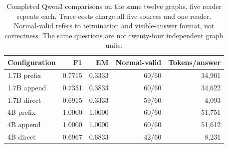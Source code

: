 \begin{table}[htbp]
\centering\small
\begin{tabular}{lrrrr}
\toprule
Configuration & F1 & EM & Normal-valid & Tokens/answer\\
\midrule
1.7B prefix & 0.7715 & 0.3333 & 60/60 & 34,901\\
1.7B append & 0.7351 & 0.3833 & 60/60 & 34,622\\
1.7B direct & 0.6915 & 0.3333 & 59/60 & 4,093\\
4B prefix & 1.0000 & 1.0000 & 60/60 & 51,751\\
4B append & 1.0000 & 1.0000 & 60/60 & 51,612\\
4B direct & 0.6967 & 0.6833 & 42/60 & 8,231\\
\bottomrule
\end{tabular}
\caption{Completed Qwen3 comparisons on the same twelve graphs, five reader repeats each. Trace costs charge all five sources and one reader. Normal-valid refers to termination and visible-answer format, not correctness. The same questions are not twenty-four independent graph units.}
\label{tab:paired-final}
\end{table}
